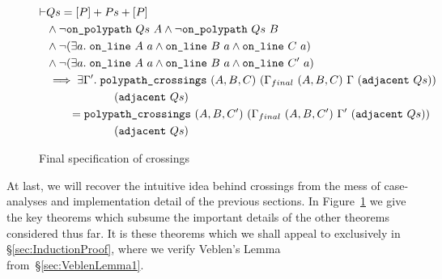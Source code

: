 \begin{figure}
\begin{multline}\label{eq:changeTriangle}
  \begin{aligned}
    \vdash&Qs = [P] + Ps + [P]\\
    &\wedge \neg\texttt{on\_polypath}\ Qs\ A \wedge \neg\texttt{on\_polypath}\ Qs\ B\\
    &\wedge \neg(\exists a.\; \texttt{on\_line}\ A\ a\wedge \texttt{on\_line}\ B\ a\wedge \texttt{on\_line}\ C\ a)\\
    &\wedge \neg(\exists a.\; \texttt{on\_line}\ A\ a\wedge \texttt{on\_line}\ B\ a\wedge \texttt{on\_line}\ C'\ a)\\
    &\implies \exists \Gamma'.\; \texttt{polypath\_crossings}\ (A,B,C)\ (\Gamma_{final}\ (A,B,C)\ \Gamma\ (\texttt{adjacent}\ Qs))\\
    &\qquad\qquad\qquad(\texttt{adjacent}\ Qs)\\
    &\qquad = \texttt{polypath\_crossings}\ (A,B,C')\ (\Gamma_{final}\ (A,B,C')\ \Gamma'\ (\texttt{adjacent}\ Qs))\\
    &\qquad\qquad\qquad(\texttt{adjacent}\ Qs)\\
  \end{aligned}
\end{multline}
\caption{Final specification of crossings}\label{fig:CrossingsSpecification}
\end{figure}

At last, we will recover the intuitive idea behind crossings from the mess of case-analyses and implementation detail of the previous sections. In Figure~\ref{fig:CrossingsSpecification} we give the key theorems which subsume the important details of the other theorems considered thus far. It is these theorems which we shall appeal to exclusively in \S\ref{sec:InductionProof}, where we verify Veblen's Lemma from~\S\ref{sec:VeblenLemma1}.


